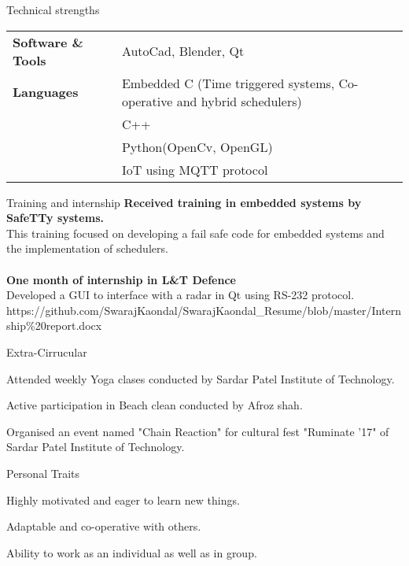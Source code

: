 \documentclass{resume} %
\begin{document}
\begin{rSection}{Technical strengths}
\begin{tabular}{ @{} >{\bfseries}l @{\hspace{6ex}} l }
Software \& Tools \ & AutoCad, Blender, Qt \\
Languages & Embedded C (Time triggered systems, Co-operative and hybrid schedulers)\\ & C++\\ & Python(OpenCv, OpenGL) \\ & IoT using MQTT protocol \\
\end{tabular}
\end{rSection}

\begin{rSection}{Training and internship}
{\bf Received training in embedded systems by SafeTTy systems.}
\\This training focused on developing a fail safe code for embedded systems and the implementation of schedulers.\\
\\{\bf One month of internship in L\&T Defence}
\\Developed a GUI to interface with a radar in Qt using RS-232 protocol.
\\https://github.com/SwarajKaondal/SwarajKaondal\_Resume/blob/master/Internship\%20report.docx
\end{rSection}

\newpage
\begin{rSection}{Extra-Cirrucular} \itemsep -3pt
\item Attended weekly Yoga clases conducted by Sardar Patel Institute of Technology.
\item Active participation in Beach clean conducted by Afroz shah.
\item Organised an event named "Chain Reaction" for cultural fest "Ruminate '17" of Sardar Patel Institute of Technology.
\end{rSection}

\begin{rSection}{Personal Traits}
\item Highly motivated and eager to learn new things.
\item Adaptable and co-operative with others.
\item Ability to work as an individual as well as in group.
\end{rSection}
\end{document}

